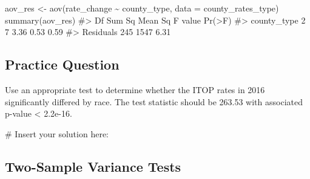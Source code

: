 \documentclass[
  letterpaper,
]{latex/krantz}
\makeatletter
\newenvironment{Shaded}{\begin{snugshade}}{\end{snugshade}}
\newcommand{\AttributeTok}[1]{\textcolor[rgb]{0.40,0.45,0.13}{#1}}
\newcommand{\CommentTok}[1]{\textcolor[rgb]{0.37,0.37,0.37}{#1}}
\newcommand{\FunctionTok}[1]{\textcolor[rgb]{0.28,0.35,0.67}{#1}}
\newcommand{\NormalTok}[1]{\textcolor[rgb]{0.00,0.23,0.31}{#1}}
\newcommand{\OtherTok}[1]{\textcolor[rgb]{0.00,0.23,0.31}{#1}}
\newcommand{\SpecialCharTok}[1]{\textcolor[rgb]{0.37,0.37,0.37}{#1}}
\newenvironment{kframe}{%
\medskip{}
\setlength{\fboxsep}{.8em}
 \def\at@end@of@kframe{}%
 \ifinner\ifhmode%
  \def\at@end@of@kframe{\end{minipage}}%
  \begin{minipage}{\columnwidth}%
 \fi\fi%
 \def\FrameCommand##1{\hskip\@totalleftmargin \hskip-\fboxsep
 \colorbox{shadecolor}{##1}\hskip-\fboxsep
     \hskip-\linewidth \hskip-\@totalleftmargin \hskip\columnwidth}%
 \MakeFramed {\advance\hsize-\width
   \@totalleftmargin\z@ \linewidth\hsize
   \@setminipage}}%
 {\par\unskip\endMakeFramed%
 \at@end@of@kframe}
\renewenvironment{Shaded}{\begin{kframe}}{\end{kframe}}
\makeatother
\begin{document}
\begin{Shaded}
\end{Shaded}

\begin{Shaded}
\begin{Highlighting}[]
\NormalTok{aov\_res }\OtherTok{\textless{}{-}} \FunctionTok{aov}\NormalTok{(rate\_change }\SpecialCharTok{\textasciitilde{}}\NormalTok{ county\_type, }
               \AttributeTok{data =}\NormalTok{ county\_rates\_type)}
\FunctionTok{summary}\NormalTok{(aov\_res)}
\CommentTok{\#\textgreater{}              Df Sum Sq Mean Sq F value Pr(\textgreater{}F)}
\CommentTok{\#\textgreater{} county\_type   2      7    3.36    0.53   0.59}
\CommentTok{\#\textgreater{} Residuals   245   1547    6.31}
\end{Highlighting}
\end{Shaded}

\subsection{Practice Question}\label{practice-question-18}

Use an appropriate test to determine whether the ITOP rates in 2016
significantly differed by race. The test statistic should be 263.53 with
associated p-value \textless{} 2.2e-16.

\begin{Shaded}
\begin{Highlighting}[]
\CommentTok{\# Insert your solution here:}
\end{Highlighting}
\end{Shaded}

\subsection{Two-Sample Variance Tests}\label{two-sample-variance-tests}
\end{document}
